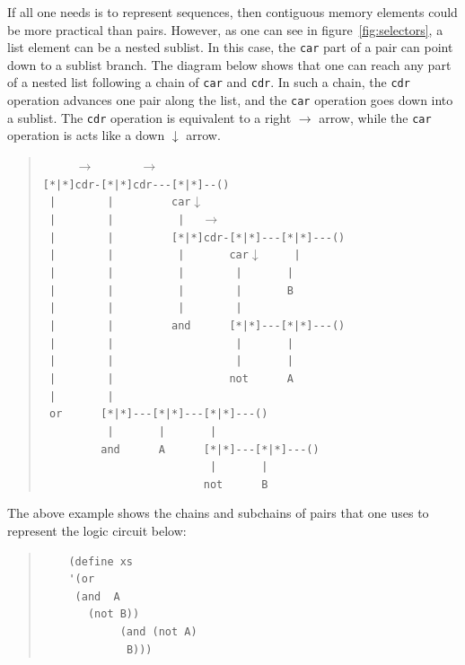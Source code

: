 \documentclass[a4paper,12pt]{book}
\newenvironment{fmpage}[1]
{\begin{lrbox}{\fmbox}\begin{minipage}{#1}}
{\end{minipage}\end{lrbox}\fbox{\usebox{\fmbox}}}
\begin{document}
\begin{fmpage}{0.8\linewidth}
	\verb||
\end{fmpage}

\vspace{0.5cm}
If all one needs is to represent
sequences, then contiguous memory
elements could be more
practical than pairs. However, as one
can see in figure~\ref{fig:selectors},
a list element can be a nested sublist.
In this case, 
the \verb|car| part of a pair can point down to
a sublist branch. The diagram below shows
that one can reach any part of a nested
list following a chain of \verb|car| and \verb|cdr|.
In such a chain, the \verb|cdr| operation
advances one pair along the list, and
the \verb|car| operation goes down into a sublist.
The \verb|cdr| operation is equivalent to a
right $\rightarrow$  arrow, while the \verb|car|
operation is acts like a down $\downarrow$ arrow.
\begin{quote}
	\verb"     "$\rightarrow$\verb"       "$\rightarrow$\\
	\verb"[*|*]cdr-[*|*]cdr---[*|*]--()"\\
	\verb" |        |         car"$\downarrow$\\
	\verb" |        |          |  " $\rightarrow$\\
	\verb" |        |         [*|*]cdr-[*|*]---[*|*]---()"\\
	\verb" |        |          |       car"$\downarrow$\verb"     |"\\
	\verb" |        |          |        |       |"\\
	\verb" |        |          |        |       B"\\
	\verb" |        |          |        |  "\\
	\verb" |        |         and      [*|*]---[*|*]---()"\\
	\verb" |        |                   |       |"\\
	\verb" |        |                   |       |"\\
	\verb" |        |                  not      A"\\
	\verb" |        |"\\
	\verb" or      [*|*]---[*|*]---[*|*]---()"\\          
	\verb"          |       |       |"\\                     
	\verb"         and      A      [*|*]---[*|*]---()"\\  
	\verb"                          |       |"\\                     
	\verb"                         not      B"                    
\end{quote}
The above example shows the chains and subchains of
pairs that one uses to represent the logic
circuit below:
\begin{quote}
	\begin{verbatim}
	(define xs
	'(or 
     (and  A  
	   (not B))
		    (and (not A)
			 B)))
	\end{verbatim}
\end{quote}
\end{document}
